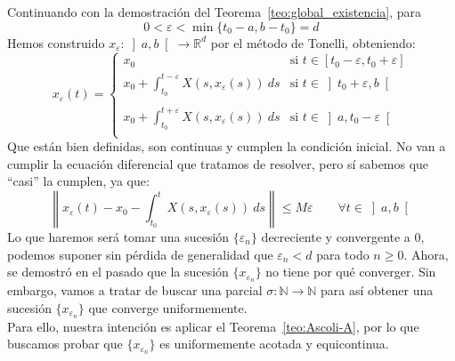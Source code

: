 \noindent
Continuando con la demostración del Teorema~\ref{teo:global_existencia}, para 
\begin{equation*}
    0 < \varepsilon < \min\{t_0-a,b-t_0\} = d
\end{equation*}
Hemos construido $x_{\varepsilon}:\left]a,b\right[\to \mathbb{R}^d$ por el método de Tonelli, obteniendo:
\begin{equation*}
    x_{\varepsilon}(t) = \left\{\begin{array}{ll}
            x_0 & \text{si\ } t\in [t_0-\varepsilon,t_0+\varepsilon] \\
          \displaystyle x_0 + \int_{t_0}^{t-\varepsilon} X(s,x_\varepsilon(s))~ds & \text{si\ } t\in \left]t_0+\varepsilon,b\right[ \\
                                                                    & \\
          \displaystyle x_0 + \int_{t_0}^{t+\varepsilon} X(s,x_\varepsilon(s))~ds & \text{si\ } t\in \left]a,t_0-\varepsilon\right[ \\
    \end{array}\right. 
\end{equation*}
Que están bien definidas, son continuas y cumplen la condición inicial. No van a cumplir la ecuación diferencial que tratamos de resolver, pero sí sabemos que ``casi'' la cumplen, ya que:
\begin{equation*}
    \left\|x_{\varepsilon}(t) - x_0 - \int_{t_0}^{t} X(s,x_{\varepsilon}(s))~ds \right\| \leq M\varepsilon \qquad \forall t\in \left]a,b\right[
\end{equation*}
Lo que haremos será tomar una sucesión $\{\varepsilon_n\}$ decreciente y convergente a $0$, podemos suponer sin pérdida de generalidad que $\varepsilon_n<d$ para todo $n\geq 0$. Ahora, se demostró en el pasado que la sucesión $\{x_{\varepsilon_n}\}$ no tiene por qué converger. Sin embargo, vamos a tratar de buscar una parcial $\sigma:\mathbb{N}\to \mathbb{N}$ para así obtener una sucesión $\{x_{\varepsilon_{n}}\}$ que converge uniformemente.\\

\noindent
Para ello, nuestra intención es aplicar el Teorema~\ref{teo:Ascoli-A}, por lo que buscamos probar que $\{x_{\varepsilon_n}\}$ es uniformemente acotada y equicontinua.\\

